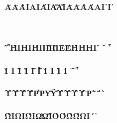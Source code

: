 \documentclass{article}
\begin{document}
  \subsubsection{\MakeUppercase{ᾰᾱᾲᾳᾴᾶᾷᾸᾹᾺΆᾼ᾽ι᾿}}
  \ %
  \subsubsection{\MakeUppercase{῀῁ῂῃῄῆῇῈΈῊΉῌ῍ ῎ ῏}}
  \subsubsection{\MakeUppercase{ῐ ῑ ῒ ΐ ῖ ῗ Ῐ Ῑ Ὶ Ί ῝῞῟}}
  \subsubsection{\MakeUppercase{ῠῡῢΰῤῥῦῧῨῩῪΎῬ῭΅`}}
  \subsubsection{\MakeUppercase{ῲῳῴῶῷῸΌῺΏῼ´῾}}

  \subsection{}

  \subsubsection{\MakeUppercase{\GreekAndCopticI}}
  \subsubsection{\MakeUppercase{\GreekAndCopticII}}
  \subsubsection{\MakeUppercase{\GreekAndCopticIII}}
  \subsubsection{\MakeUppercase{\GreekAndCopticIV}}

  \subsubsection{\MakeUppercase{\GreekExtendedI}}
  \subsubsection{\MakeUppercase{\GreekExtendedII}}
\end{document}
